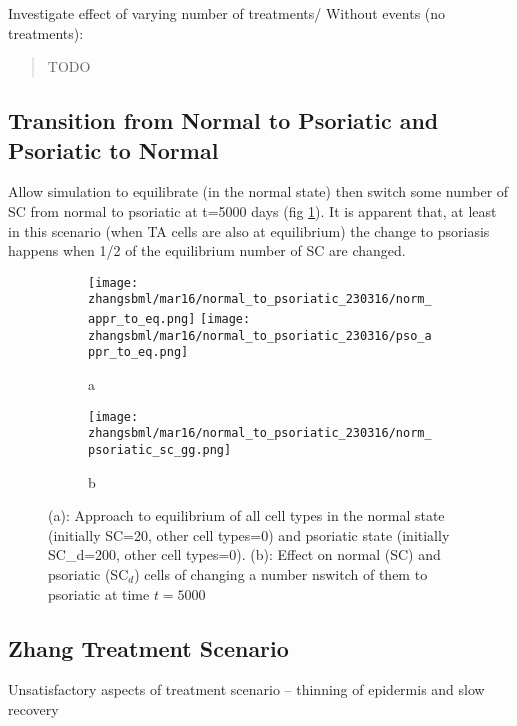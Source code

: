 \documentclass[a4paper,10pt]{report}
\newcommand{\psortbase}{/home/ngrs2/work/bsu/PSORT_Zuliani_Reynolds/}
\newcommand{\sbmlbase}{\psortbase/sbml-sh/}
\newcommand{\zhangsbml}{\sbmlbase/zhang_model}
\begin{document}
Investigate effect of varying number of treatments/ 
Without events (no treatments):  

\begin{quote}
TODO
\end{quote}



\subsection{Transition from Normal to Psoriatic and Psoriatic to Normal}

Allow simulation to equilibrate (in the normal state) then switch some
number of SC from normal to psoriatic at t=5000 days (fig \ref{fig:normpsoswitch}).  It is apparent that, at least in this scenario (when TA cells are also at equilibrium) the change to psoriasis happens when 1/2 of the equilibrium number of SC are changed. 

\begin{figure}[h!]
  \begin{subfigure}{\textwidth}
    \texttt{[image: \\zhangsbml/mar16/normal\_to\_psoriatic\_230316/norm\_appr\_to\_eq.png]}
    \texttt{[image: \\zhangsbml/mar16/normal\_to\_psoriatic\_230316/pso\_appr\_to\_eq.png]}
    \caption{a}
  \end{subfigure}
  \begin{subfigure}{\textwidth}
    \centering
    \texttt{[image: \\zhangsbml/mar16/normal\_to\_psoriatic\_230316/norm\_psoriatic\_sc\_gg.png]}
    \caption{b}
  \end{subfigure}
  \caption{(a): Approach to equilibrium of all cell types in the normal state (initially SC=20, other cell types=0) and psoriatic state (initially SC\_d=200, other cell types=0). (b): Effect on normal (SC) and psoriatic (SC$_d$) cells of changing a number nswitch of them to psoriatic at time $t=5000$}
  \label{fig:normpsoswitch}
\end{figure}



\subsection{Zhang Treatment Scenario}\label{sec:ztreatment}

Unsatisfactory aspects of treatment scenario -- thinning of epidermis and slow recovery
\end{document}
